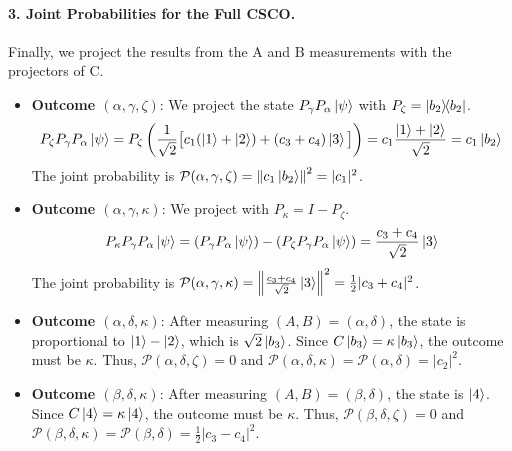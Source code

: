 \documentclass[11pt,a4paper]{article}
\begin{document}
\paragraph{3. Joint Probabilities for the Full CSCO.}
Finally, we project the results from the A and B measurements with the
projectors of C.
\begin{itemize}
  \item \textbf{Outcome $(\alpha, \gamma, \zeta)$}: We project the state
    $P_\gamma P_\alpha \ket{\psi}$ with $P_\zeta = \dyad{b_2}{b_2}$.
    $$ P_\zeta P_\gamma P_\alpha \ket{\psi} = P_\zeta \left( \frac{1}{\sqrt{2}}
    \big[ c_1(\ket{1}+\ket{2}) + (c_3+c_4)\ket{3} \big] \right) = c_1
    \frac{\ket{1}+\ket{2}}{\sqrt{2}} = c_1 \ket{b_2} $$
    The joint probability is $\mathcal{P}(\alpha, \gamma, \zeta) = \norm{c_1
    \ket{b_2}}^2 = |c_1|^2$.

  \item \textbf{Outcome $(\alpha, \gamma, \kappa)$}: We project with $P_\kappa =
    I - P_\zeta$.
    $$ P_\kappa P_\gamma P_\alpha \ket{\psi} = (P_\gamma P_\alpha \ket{\psi}) -
    (P_\zeta P_\gamma P_\alpha \ket{\psi}) = \frac{c_3+c_4}{\sqrt{2}}\ket{3} $$
    The joint probability is $\mathcal{P}(\alpha, \gamma, \kappa) =
    \norm{\frac{c_3+c_4}{\sqrt{2}}\ket{3}}^2 = \frac{1}{2}|c_3+c_4|^2$.

  \item \textbf{Outcome $(\alpha, \delta, \kappa)$}: After measuring
    $(A,B)=(\alpha,\delta)$, the state is proportional to $\ket{1}-\ket{2}$,
    which is $\sqrt{2}\ket{b_3}$. Since $C\ket{b_3}=\kappa\ket{b_3}$, the
    outcome must be $\kappa$. Thus, $\mathcal{P}(\alpha, \delta, \zeta)=0$ and
    $\mathcal{P}(\alpha, \delta, \kappa) = \mathcal{P}(\alpha, \delta) =
    |c_2|^2$.

  \item \textbf{Outcome $(\beta, \delta, \kappa)$}: After measuring
    $(A,B)=(\beta,\delta)$, the state is $\ket{4}$. Since
    $C\ket{4}=\kappa\ket{4}$, the outcome must be $\kappa$. Thus,
    $\mathcal{P}(\beta, \delta, \zeta)=0$ and $\mathcal{P}(\beta, \delta,
    \kappa) = \mathcal{P}(\beta, \delta) = \frac{1}{2}|c_3-c_4|^2$.
\end{itemize}
\end{document}
